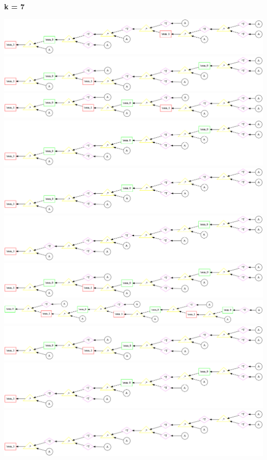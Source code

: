 {\bf k = 7}


\begin{center}
\includegraphics[width=0.45\linewidth]{trees/Sym_7_horizontal_0.png}
\includegraphics[width=0.45\linewidth]{trees/Sym_7_horizontal_1.png}
\includegraphics[width=0.45\linewidth]{trees/Sym_7_horizontal_2.png}
\includegraphics[width=0.45\linewidth]{trees/Sym_7_horizontal_3.png}
\includegraphics[width=0.45\linewidth]{trees/Sym_7_horizontal_4.png}
\includegraphics[width=0.45\linewidth]{trees/Sym_7_horizontal_5.png}
\includegraphics[width=0.45\linewidth]{trees/Sym_7_horizontal_6.png}
\includegraphics[width=0.45\linewidth]{trees/Sym_7_horizontal_7.png}
\includegraphics[width=0.45\linewidth]{trees/Sym_7_horizontal_8.png}
\includegraphics[width=0.45\linewidth]{trees/Sym_7_horizontal_9.png}
\includegraphics[width=0.45\linewidth]{trees/Sym_7_horizontal_10.png}

\end{center}
